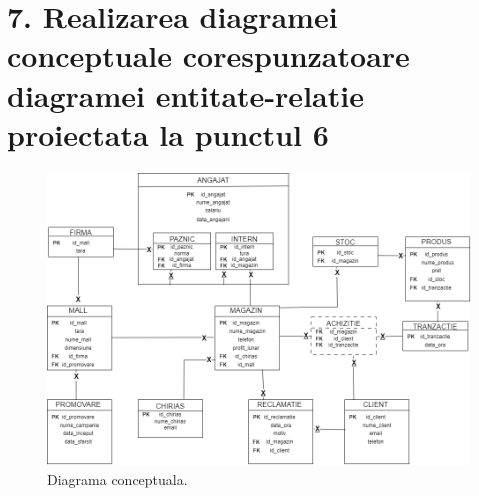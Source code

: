 
\section*{7. Realizarea diagramei conceptuale corespunzatoare diagramei entitate-relatie proiectata la punctul 6}
\vspace{1cm}
\begin{figure}[h]
  \centerline{\includegraphics[scale=0.6]{images/CONCEPTUALA.png}}
  \caption{ Diagrama conceptuala.}
\end{figure}
